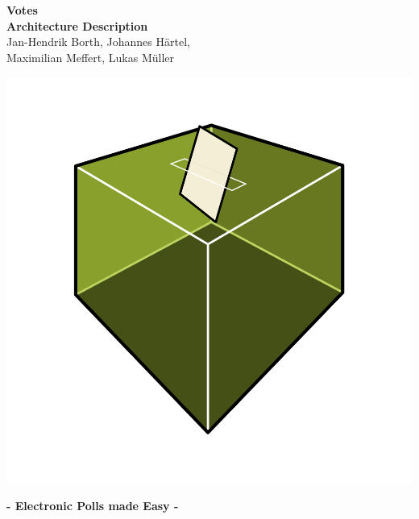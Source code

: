 \documentclass[a4paper]{scrreprt}
\begin{document}
\begin{titlepage}

\centering


{\Huge \textbf{Votes}}
\\ \vspace*{3mm}
{\huge \textbf{Architecture Description}}
\\ \vspace*{3mm}
{\large
Jan-Hendrik Borth,
Johannes Härtel,\\
Maximilian Meffert, 
Lukas Müller 
}

\includegraphics[width=\textwidth]{votes.png}

{\LARGE \textbf{- Electronic Polls made Easy -}}


\end{titlepage}
  

\tableofcontents
\listoffigures
\end{document}
